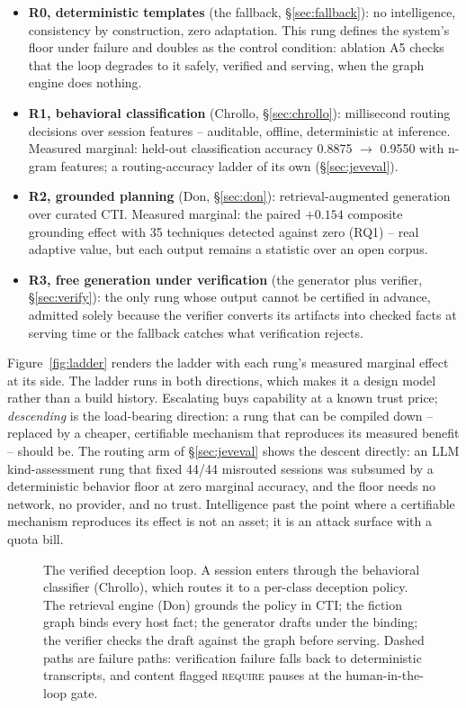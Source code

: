 \begin{itemize}
\item \textbf{R0, deterministic templates} (the fallback,
\S\ref{sec:fallback}): no intelligence, consistency by
construction, zero adaptation. This rung defines the system's floor
under failure and doubles as the control condition: ablation A5 checks that the
loop degrades to it safely, verified and serving, when the graph engine
does nothing.
\item \textbf{R1, behavioral classification} (Chrollo,
\S\ref{sec:chrollo}): millisecond routing decisions over session
features -- auditable, offline, deterministic at inference. Measured
marginal: held-out classification accuracy 0.8875 $\to$ 0.9550 with
n-gram features; a routing-accuracy ladder of its own
(\S\ref{sec:jeveval}).
\item \textbf{R2, grounded planning} (Don, \S\ref{sec:don}):
retrieval-augmented generation over curated CTI. Measured marginal: the
paired $+0.154$ composite grounding effect with 35 techniques detected
against zero (RQ1) -- real adaptive value, but each output remains a
statistic over an open corpus.
\item \textbf{R3, free generation under verification} (the generator
plus verifier, \S\ref{sec:verify}): the only rung whose output cannot be
certified in advance, admitted solely because the verifier converts its
artifacts into checked facts at serving time or the fallback catches
what verification rejects.
\end{itemize}

\noindent Figure~\ref{fig:ladder} renders the ladder with each rung's
measured marginal effect at its side.
The ladder runs in both directions, which makes it a design
model rather than a build history. Escalating buys capability at
a known trust price; \emph{descending} is the load-bearing direction: a
rung that can be compiled down -- replaced by a cheaper, certifiable
mechanism that reproduces its measured benefit -- should be. The routing
arm of \S\ref{sec:jeveval} shows the descent directly: an LLM
kind-assessment rung that fixed 44/44 misrouted sessions was subsumed by
a deterministic behavior floor at zero marginal accuracy, and the floor
needs no network, no provider, and no trust. Intelligence past the point
where a certifiable mechanism reproduces its effect is not an asset; it
is an attack surface with a quota bill.

\begin{figure}[t]
\centering

\caption{The verified deception loop. A session enters through the
behavioral classifier (Chrollo), which routes it to a per-class deception
policy. The retrieval engine (Don) grounds the policy in CTI; the fiction
graph binds every host fact; the generator drafts under the binding; the
verifier checks the draft against the graph before serving. Dashed paths
are failure paths: verification failure falls back to deterministic
transcripts, and content flagged \textsc{require} pauses at the
human-in-the-loop gate.}
\label{fig:architecture}
\end{figure}

